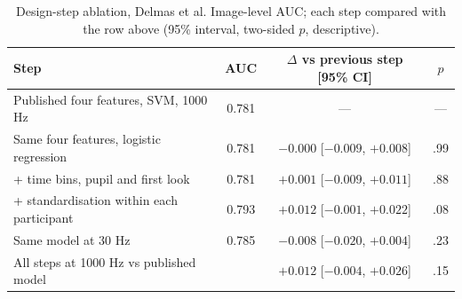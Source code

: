 \begin{table}[!htbp]
\caption{Design-step ablation, Delmas et al. Image-level AUC; each step compared with the row above (95\% interval, two-sided $p$, descriptive).}\label{tab:ablation}
\scriptsize\setlength{\tabcolsep}{3pt}
\begin{tabular}{@{}lccc@{}}
\toprule
Step & AUC & $\Delta$ vs previous step [95\% CI] & $p$ \\
\midrule
Published four features, SVM, 1000 Hz & 0.781 & --- & --- \\
Same four features, logistic regression & 0.781 & $-0.000$ [$-0.009$, $+0.008$] & .99 \\
+ time bins, pupil and first look & 0.781 & $+0.001$ [$-0.009$, $+0.011$] & .88 \\
+ standardisation within each participant & 0.793 & $+0.012$ [$-0.001$, $+0.022$] & .08 \\
Same model at 30 Hz & 0.785 & $-0.008$ [$-0.020$, $+0.004$] & .23 \\
\midrule
All steps at 1000 Hz vs published model & & $+0.012$ [$-0.004$, $+0.026$] & .15 \\
\bottomrule
\end{tabular}
\end{table}
